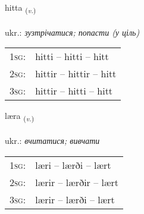 \documentclass[frontgrid, backgrid]{flacards}\usepackage[]{graphicx}\usepackage[]{xcolor}
\begin{document}
\renewcommand{\blhead}{\vskip5pt {\small\bfseries\footnotesize Sagnorð | дієслово }}
\renewcommand{\bcfoot}{\vskip5pt \hspace{2pt}{\small\bfseries\footnotesize 1K}}


{hitta \small{\textsubscript{(\textit{v.})}} \\[1ex] %
\textphonetic{[hɪhta]} \\
ukr.: \emph{зузтрічатися; попасти (у ціль)} \\  [2ex]
\renewcommand*{\arraystretch}{0.8}
\begin{tabular}{p{1cm}l}
\textsc{1sg}: & hitti -- hitti -- hitt \\ 
\textsc{2sg}: & hittir -- hittir -- hitt \\ 
\textsc{3sg}: & hittir -- hitti -- hitt \\ 
\end{tabular}
}

\renewcommand{\flhead}{\vskip5pt \fboxsep=0pt {\small\bfseries\footnotesize Sagnorð | дієслово}}
\renewcommand{\fcfoot}{\vskip5pt \fboxsep=0pt \hspace{2pt}{\small\bfseries\footnotesize 1K}}

\renewcommand{\blhead}{\vskip5pt {\small\bfseries\footnotesize Sagnorð | дієслово }}
\renewcommand{\bcfoot}{\vskip5pt \hspace{2pt}{\small\bfseries\footnotesize 1K}}


{læra \small{\textsubscript{(\textit{v.})}} \\[1ex] %
\textphonetic{[laiːra]} \\
ukr.: \emph{вчитатися; вивчати} \\  [2ex]
\renewcommand*{\arraystretch}{0.8}
\begin{tabular}{p{1cm}l}
\textsc{1sg}: & læri -- lærði -- lært \\ 
\textsc{2sg}: & lærir -- lærðir -- lært \\ 
\textsc{3sg}: & lærir -- lærði -- lært \\ 
\end{tabular}
}
\end{document}
